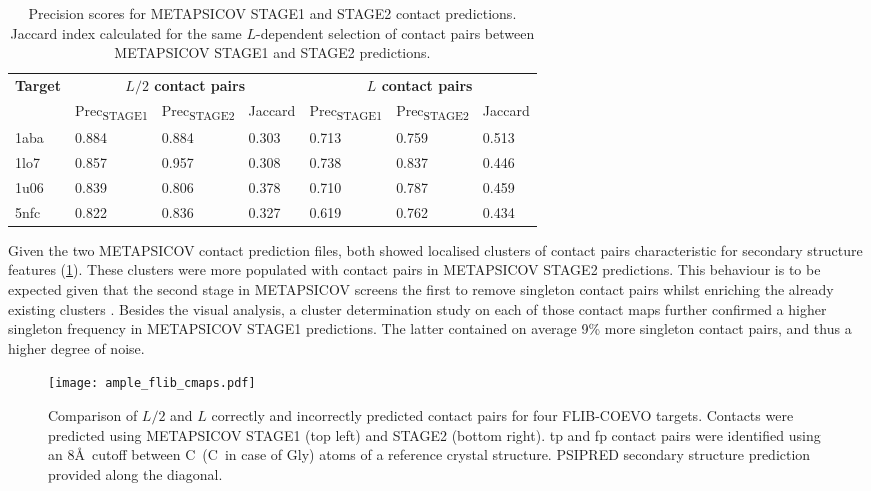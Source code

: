 \begin{table}[H]
  \centering
  \caption[Contact prediction summary for FLIB-COEVO targets]{Precision scores for METAPSICOV \cite{Jones2015-vq} STAGE1 and STAGE2 contact predictions. Jaccard index calculated for the same $L$-dependent selection of contact pairs between METAPSICOV STAGE1 and STAGE2 predictions.}
  \label{table:ample_flib_contact_precision}
  \begin{tabularx}{\textwidth}{X X X X X X X}
      \hline
	  \multirow{2}{*}{\textbf{Target}} & \multicolumn{3}{c}{\textbf{$L/2$ contact pairs}} & \multicolumn{3}{c}{\textbf{$L$ contact pairs}} 	\\ \cline{2-7}
	  							&  	Prec\textsubscript{STAGE1}	& 	Prec\textsubscript{STAGE2}	& 	Jaccard 	& 	Prec\textsubscript{STAGE1} 	& 	Prec\textsubscript{STAGE2} 	& 	Jaccard	\\
	  \hline
	  1aba						&	0.884	&	0.884	&	0.303	&	0.713	&	0.759	&	0.513		\\
	  1lo7						&	0.857	&	0.957	&	0.308	&	0.738	&	0.837	&	0.446		\\
	  1u06						&	0.839	&	0.806	&	0.378	&	0.710	&	0.787	&	0.459		\\
	  5nfc						&	0.822	&	0.836	&	0.327	&	0.619	&	0.762	&	0.434		\\ 
	  \hline
  \end{tabularx}
\end{table}

Given the two METAPSICOV contact prediction files, both showed localised clusters of contact pairs characteristic for secondary structure features (\cref{fig:ample_flib_cmaps}). These clusters were more populated with contact pairs in METAPSICOV STAGE2 predictions. This behaviour is to be expected given that the second stage in METAPSICOV screens the first to remove singleton contact pairs whilst enriching the already existing clusters \cite{Jones2015-vq}. Besides the visual analysis, a cluster determination study on each of those contact maps further confirmed a higher singleton frequency in METAPSICOV STAGE1 predictions. The latter contained on average 9\% more singleton contact pairs, and thus a higher degree of noise.

\begin{figure}[H]
	\centering
	\texttt{[image: ample\_flib\_cmaps.pdf]}
        \caption[Contact map comparison for FLIB-COEVO targets]{Comparison of $L/2$ and $L$ correctly and incorrectly predicted contact pairs for four FLIB-COEVO targets. Contacts were predicted using METAPSICOV \cite{Jones2015-vq} STAGE1 (top left) and STAGE2 (bottom right). \Gls{tp} and \gls{fp} contact pairs were identified using an 8\AA\ cutoff between C\textalpha\ (C\textbeta\ in case of Gly) atoms of a reference crystal structure. PSIPRED \cite{Jones1999-ed} secondary structure prediction provided along the diagonal.}
	\label{fig:ample_flib_cmaps}
\end{figure}

